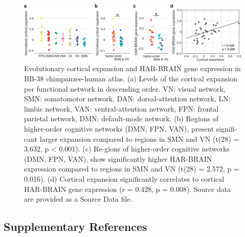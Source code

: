 \begin{refsection}
\begin{figure}[H]
    \centering
    \includegraphics[width=\linewidth]{images/harFigS14.png}
    \caption{Evolutionary cortical expansion and HAR-BRAIN gene expression in BB-38 chimpanzee-human atlas. (a) Levels of the cortical expansion per functional network in descending order. VN: visual network, SMN: somatomotor network, DAN: dorsal-attention network, LN: limbic network, VAN: ventral-attention network, FPN: frontal parietal network, DMN: default-mode network. (b) Regions of higher-order cognitive networks (DMN, FPN, VAN), present signifi-cant larger expansion compared to regions in SMN and VN (t(28) = 3.632, p < 0.001). (c) Re-gions of higher-order cognitive networks (DMN, FPN, VAN), show significantly higher HAR-BRAIN expression compared to regions in SMN and VN (t(28) = 2.572, p = 0.016). (d) Cortical expansion significantly correlates to cortical HAR-BRAIN gene expression (r = 0.428, p = 0.008). Source data are provided as a Source Data file.}
    \label{harFigs14}
\end{figure}

\newpage
\subsection*{Supplementary References}
\printbibliography[heading=none]

\end{refsection}

